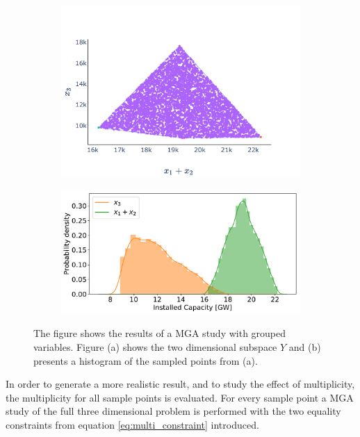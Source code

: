 \begin{figure}[h]\centering
	\begin{subfigure}{.48\textwidth} \centering
		\includegraphics[width=1.\textwidth]{./Images/multi_1}
		\caption{}
		\label{fig:multi_1}
	\end{subfigure}
	\begin{subfigure}{.48\textwidth}  \centering
		\includegraphics[width=1.\textwidth]{./Images/multi_2}
		\caption{}
		\label{fig:multi_2}
	\end{subfigure}
	\caption{The figure shows the results of a MGA study with grouped variables. Figure (a) shows the two dimensional subspace $Y$ and (b) presents a histogram of the sampled points from (a). }
	\label{fig:multi_no_weights}
\end{figure}


In order to generate a more realistic result, and to study the effect of multiplicity, the multiplicity for all sample points is evaluated. For every sample point a MGA study of the full three dimensional problem is performed with the two equality constraints from equation \ref{eq:multi_constraint} introduced.

